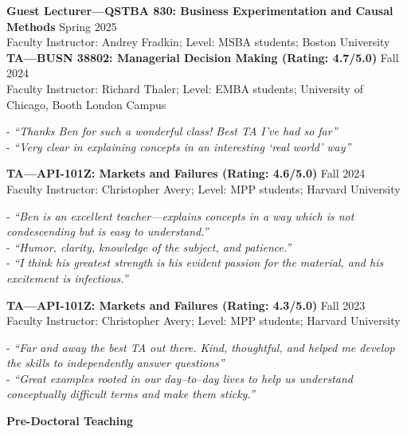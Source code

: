 \documentclass[11.25pt]{article}
\begin{document}

\textbf{Guest Lecturer---QSTBA 830: Business Experimentation and Causal Methods}  \hfill Spring 2025\\
Faculty Instructor: Andrey Fradkin; Level: MSBA students; Boston University\vspace{2mm}\\
\textbf{TA---BUSN 38802: Managerial Decision Making (Rating: 4.7/5.0)} \hfill Fall 2024\\
Faculty Instructor: Richard Thaler; Level: EMBA students; University of Chicago, Booth London Campus
    \begin{myindentpar}{.35cm}
    - \emph{``Thanks Ben for such a wonderful class! Best TA I've had so far''}\\
    - \emph{``Very clear in explaining concepts in an interesting `real world' way''}\\
    \end{myindentpar}
\vspace{-2mm}
\textbf{TA---API-101Z: Markets and Failures (Rating: 4.6/5.0)} \hfill Fall 2024\\
Faculty Instructor: Christopher Avery; Level: MPP students; Harvard University
     \begin{myindentpar}{.35cm}
    - \emph{``Ben is an excellent teacher---explains concepts in a way which is not condescending but is easy to understand.''}\\
    - \emph{``Humor, clarity, knowledge of the subject, and patience.''}\\
    - \emph{``I think his greatest strength is his evident passion for the material, and his excitement is infectious.''}
    \end{myindentpar}
\textbf{TA---API-101Z: Markets and Failures (Rating: 4.3/5.0)} \hfill Fall 2023\\
Faculty Instructor: Christopher Avery; Level: MPP students; Harvard University
    \begin{myindentpar}{.35cm}
    - \emph{``Far and away the best TA out there. Kind, thoughtful, and helped me develop the skills to independently answer questions''}\\
    - \emph{``Great examples rooted in our day–to–day lives to help us understand conceptually difficult terms and make them sticky.''}\\
    \end{myindentpar}
\vspace{-1mm}
\textbf{Pre-Doctoral Teaching}\\
\end{document}
